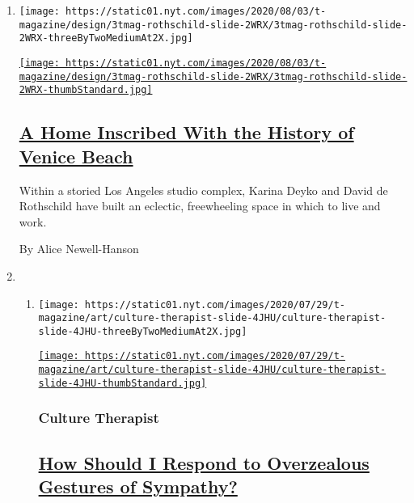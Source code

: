 \begin{enumerate}
\def\labelenumi{\arabic{enumi}.}
\item
  \texttt{[image: https://static01.nyt.com/images/2020/08/03/t-magazine/design/3tmag-rothschild-slide-2WRX/3tmag-rothschild-slide-2WRX-threeByTwoMediumAt2X.jpg]}

  \href{/2020/08/03/t-magazine/david-de-rothschild-venice-home-design.html}{\texttt{[image: https://static01.nyt.com/images/2020/08/03/t-magazine/design/3tmag-rothschild-slide-2WRX/3tmag-rothschild-slide-2WRX-thumbStandard.jpg]}}

  \hypertarget{a-home-inscribed-with-the-history-of-venice-beach}{%
  \subsection{\texorpdfstring{\href{/2020/08/03/t-magazine/david-de-rothschild-venice-home-design.html}{A
  Home Inscribed With the History of Venice
  Beach}}{A Home Inscribed With the History of Venice Beach}}\label{a-home-inscribed-with-the-history-of-venice-beach}}

  Within a storied Los Angeles studio complex, Karina Deyko and David de
  Rothschild have built an eclectic, freewheeling space in which to live
  and work.

  By Alice Newell-Hanson
\item
  \begin{enumerate}
  \def\labelenumii{\arabic{enumii}.}
  \item
    \texttt{[image: https://static01.nyt.com/images/2020/07/29/t-magazine/art/culture-therapist-slide-4JHU/culture-therapist-slide-4JHU-threeByTwoMediumAt2X.jpg]}

    \href{/2020/07/31/t-magazine/culture-therapist-grief.html}{\texttt{[image: https://static01.nyt.com/images/2020/07/29/t-magazine/art/culture-therapist-slide-4JHU/culture-therapist-slide-4JHU-thumbStandard.jpg]}}

    \hypertarget{culture-therapist}{%
    \subsubsection{Culture Therapist}\label{culture-therapist}}

    \hypertarget{how-should-i-respond-to-overzealous-gestures-of-sympathy}{%
    \subsection{\texorpdfstring{\href{/2020/07/31/t-magazine/culture-therapist-grief.html}{How
    Should I Respond to Overzealous Gestures of
    Sympathy?}}{How Should I Respond to Overzealous Gestures of Sympathy?}}\label{how-should-i-respond-to-overzealous-gestures-of-sympathy}}


\end{enumerate}
\end{enumerate}
